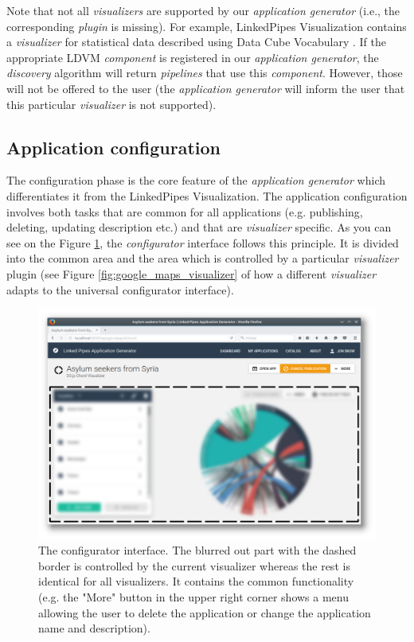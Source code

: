 Note that not all \emph{visualizers} are supported by our \emph{application generator} (i.e., the corresponding \emph{plugin} is missing). For example, LinkedPipes Visualization contains a \emph{visualizer} for statistical data described using Data Cube Vocabulary \cite{datacube_vocabulary}. If the appropriate LDVM \emph{component} is registered in our \emph{application generator}, the \emph{discovery} algorithm will return \emph{pipelines} that use this \emph{component}. However, those will not be offered to the user (the \emph{application generator} will inform the user that this particular \emph{visualizer} is not supported).

\subsection{Application configuration}

The configuration phase is the core feature of the \emph{application generator} which differentiates it from the LinkedPipes Visualization. The application configuration involves both tasks that are common for all applications (e.g. publishing, deleting, updating description etc.) and that are \emph{visualizer} specific. As you can see on the Figure \ref{fig:configurator}, the \emph{configurator} interface follows this principle. It is divided into the common area and the area which is controlled by a particular \emph{visualizer} plugin (see Figure \ref{fig:google_maps_visualizer} of how a different \emph{visualizer} adapts to the universal configurator interface). 

\begin{figure}
	\centering
	\includegraphics[width=145mm]{img/05_configurator.png}
	\caption{The configurator interface. The blurred out part with the dashed border is controlled by the current visualizer whereas the rest is identical for all visualizers. It contains the common functionality (e.g. the "More" button in the upper right corner shows a menu allowing the user to delete the application or change the application name and description).}
    \label{fig:configurator}
\end{figure}

